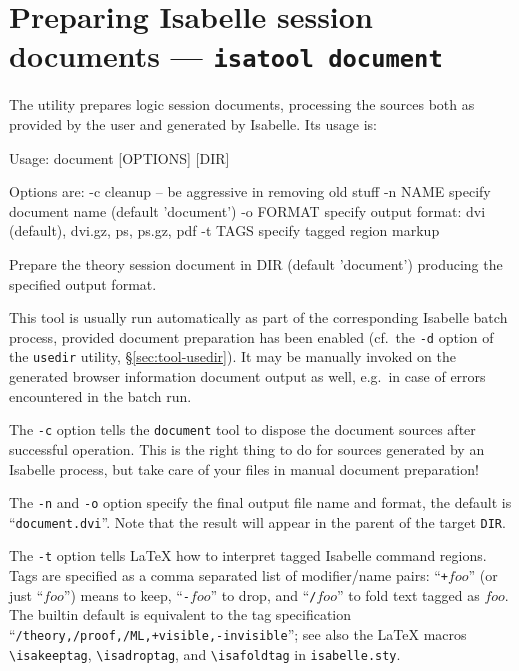 \section{Preparing Isabelle session documents --- \texttt{isatool document}}
\label{sec:tool-document}

The  utility prepares logic session documents, processing the
sources both as provided by the user and generated by Isabelle.  Its usage is:
\begin{ttbox}
Usage: document [OPTIONS] [DIR]

  Options are:
    -c           cleanup -- be aggressive in removing old stuff
    -n NAME      specify document name (default 'document')
    -o FORMAT    specify output format: dvi (default), dvi.gz, ps,
                 ps.gz, pdf
    -t TAGS      specify tagged region markup

  Prepare the theory session document in DIR (default 'document')
  producing the specified output format.
\end{ttbox}
This tool is usually run automatically as part of the corresponding Isabelle
batch process, provided document preparation has been enabled (cf.\ the
\texttt{-d} option of the \texttt{usedir} utility, \S\ref{sec:tool-usedir}).
It may be manually invoked on the generated browser information document
output as well, e.g.\ in case of errors encountered in the batch run.

\medskip The \texttt{-c} option tells the \texttt{document} tool to dispose
the document sources after successful operation.  This is the right thing to
do for sources generated by an Isabelle process, but take care of your files
in manual document preparation!

\medskip The \texttt{-n} and \texttt{-o} option specify the final output file
name and format, the default is ``\texttt{document.dvi}''.  Note that the
result will appear in the parent of the target \texttt{DIR}.

\medskip The \texttt{-t} option tells {\LaTeX} how to interpret tagged
Isabelle command regions.  Tags are specified as a comma separated list of
modifier/name pairs: ``\verb,+,$foo$'' (or just ``$foo$'') means to keep,
``\verb,-,$foo$'' to drop, and ``\verb,/,$foo$'' to fold text tagged as $foo$.
The builtin default is equivalent to the tag specification
``\texttt{/theory,/proof,/ML,+visible,-invisible}''; see also the {\LaTeX}
macros \verb,\isakeeptag,, \verb,\isadroptag,, and \verb,\isafoldtag, in
\texttt{isabelle.sty}.

